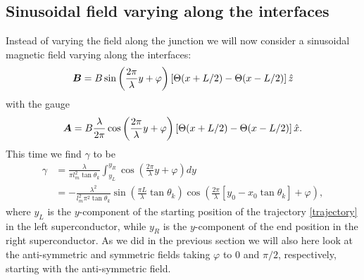 \subsection{Sinusoidal field varying along the interfaces}
\label{sec:alongInterface}
Instead of varying the field along the junction we will now consider a sinusoidal magnetic field varying along the interfaces:
\begin{equation}
    \boldsymbol{B} = B\sin\left(\frac{2\pi}{\lambda}y + \varphi\right)\left[\Theta(x+L/2) - \Theta(x-L/2) \right]\hat{z}
\label{Binterface}
\end{equation}
with the gauge
\begin{equation}
    \boldsymbol{A} = B\frac{\lambda}{2\pi}\cos\left(\frac{2\pi}{\lambda}y+\varphi\right)\left[\Theta(x+L/2) - \Theta(x-L/2) \right]\hat{x}.
\end{equation}
This time we find $\gamma$ to be
\begin{equation}
\begin{split}
    \gamma &= 
    \frac{\lambda}{\pi l_m^2 \tan\theta_k}\int_{y_L}^{y_R} \cos\left(\frac{2\pi}{\lambda}y + \varphi \right) dy
    \\
    &= -\frac{\lambda^2}{l_m^2\pi^2\tan\theta_k}\sin\left(\frac{\pi L}{\lambda}\tan\theta_k\right)\cos\left(\frac{2\pi}{\lambda}\left[y_0-x_0\tan\theta_k\right] + \varphi\right),
\end{split}
\end{equation}
where $y_L$ is the $y$-component of the starting position of the trajectory \eqref{trajectory} in the left superconductor, while $y_R$ is the $y$-component of the end position in the right superconductor. As we did in the previous section we will also here look at the anti-symmetric and symmetric fields taking $\varphi$ to $0$ and $\pi/2$, respectively, starting with the anti-symmetric field.

